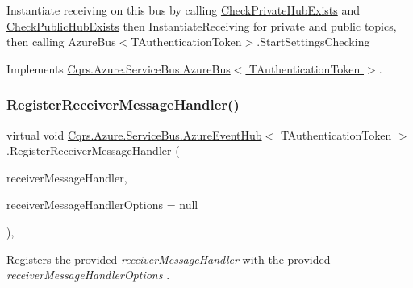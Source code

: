 Instantiate receiving on this bus by calling \hyperlink{classCqrs_1_1Azure_1_1ServiceBus_1_1AzureEventHub_a2da39ab1b2bc5fe995b6bd1fea461852_a2da39ab1b2bc5fe995b6bd1fea461852}{Check\+Private\+Hub\+Exists} and \hyperlink{classCqrs_1_1Azure_1_1ServiceBus_1_1AzureEventHub_aee7b4360172cf49fb2e885a3a525aa66_aee7b4360172cf49fb2e885a3a525aa66}{Check\+Public\+Hub\+Exists} then Instantiate\+Receiving for private and public topics, then calling Azure\+Bus$<$\+T\+Authentication\+Token$>$.\+Start\+Settings\+Checking 



Implements \hyperlink{classCqrs_1_1Azure_1_1ServiceBus_1_1AzureBus_ac9f66dd531dcde49be72ba8f2cb28e9b_ac9f66dd531dcde49be72ba8f2cb28e9b}{Cqrs.\+Azure.\+Service\+Bus.\+Azure\+Bus$<$ T\+Authentication\+Token $>$}.

\mbox{\label{classCqrs_1_1Azure_1_1ServiceBus_1_1AzureEventHub_afbea0e107f3d4e8f8d4f2215ff2f7787_afbea0e107f3d4e8f8d4f2215ff2f7787}} 
\subsubsection{\texorpdfstring{Register\+Receiver\+Message\+Handler()}{RegisterReceiverMessageHandler()}}
{\footnotesize\ttfamily virtual void \hyperlink{classCqrs_1_1Azure_1_1ServiceBus_1_1AzureEventHub}{Cqrs.\+Azure.\+Service\+Bus.\+Azure\+Event\+Hub}$<$ T\+Authentication\+Token $>$.Register\+Receiver\+Message\+Handler (\begin{DoxyParamCaption}\item[{Action$<$ Partition\+Context, Event\+Data $>$}]{receiver\+Message\+Handler,  }\item[{Event\+Processor\+Options}]{receiver\+Message\+Handler\+Options = {\ttfamily null} }\end{DoxyParamCaption})\hspace{0.3cm}{\ttfamily [protected]}, {\ttfamily [virtual]}}



Registers the provided {\itshape receiver\+Message\+Handler}  with the provided {\itshape receiver\+Message\+Handler\+Options} . 

